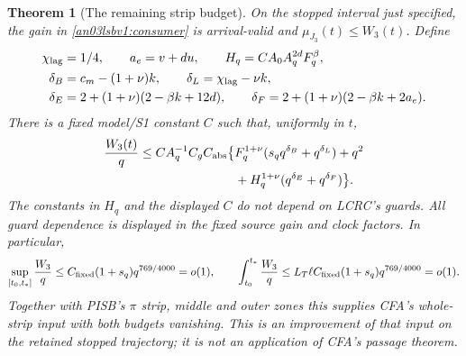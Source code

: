 \documentclass[11pt]{article}
\newtheorem{theorem}{Theorem}[section]
\theoremstyle{remark}\newtheorem{remark}[theorem]{Remark}
\begin{document}
\begin{theorem}[The remaining strip budget]
\label{an03lsbv1:main}
On the stopped interval just specified, the gain in
\eqref{an03lsbv1:consumer} is arrival-valid and $\mu_{J_3}(t)\le W_3(t)$.
Define
\begin{align}
 \chi_{\rm lag}&=1/4,\qquad a_e=v+du,\qquad
 H_q=C A_0 A_q^{2d}F_q^\beta,\nonumber\\
 \delta_B&=c_m-(1+\nu)k,\qquad
 \delta_L=\chi_{\rm lag}-\nu k,\nonumber\\
 \delta_E&=2+(1+\nu)(2-\beta k+12d),\qquad
 \delta_F=2+(1+\nu)(2-\beta k+2a_e).
 \label{an03lsbv1:exponents}
\end{align}
There is a fixed model/S1 constant $C$ such that, uniformly in $t$,
\begin{align}
 \frac{W_3(t)}q\le C A_q^{-1} C_g C_{\rm abs}
 \big\{&F_q^{1+\nu}(s_q q^{\delta_B}+q^{\delta_L})+q^2\nonumber\\
       &+H_q^{1+\nu}(q^{\delta_E}+q^{\delta_F})\big\}.
 \label{an03lsbv1:budget}
\end{align}
The constants in $H_q$ and the displayed $C$ do not depend on LCRC's
guards. All guard dependence is displayed in the fixed source gain and
clock factors. In particular,
\begin{equation}
 \sup_{[t_0,t_*]}\frac{W_3}q
 \le C_{\rm fixed}(1+s_q)q^{769/4000}=o(1),\qquad
 \int_{t_0}^{t_*}\frac{W_3}q
 \le L_T\ell C_{\rm fixed}(1+s_q)q^{769/4000}=o(1).
 \label{an03lsbv1:finalbudget}
\end{equation}
Together with PISB's $\pi$ strip, middle and outer zones this supplies
CFA's whole-strip input with both budgets vanishing. This is an
improvement of that input on the retained stopped trajectory; it is
not an application of CFA's passage theorem.
\end{theorem}
\end{document}
